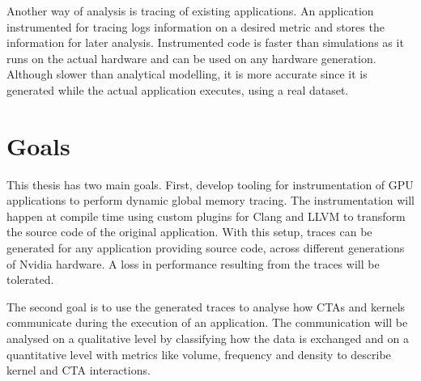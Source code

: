 Another way of analysis is tracing of existing applications. An application instrumented for tracing logs information on a desired metric and stores the information for later analysis. Instrumented code is faster than simulations as it runs on the actual hardware and can be used on any hardware generation. Although slower than analytical modelling, it is  more accurate since it is generated while the actual application executes, using a real dataset.


%	
\section{Goals}
This thesis has two main goals. First, develop tooling for instrumentation of GPU applications to perform dynamic global memory tracing. The instrumentation will happen at compile time using custom plugins for Clang and LLVM to transform the source code of the
original application. With this setup, traces can be generated for any application providing source code,
across different generations of Nvidia hardware. A loss in performance resulting from the traces will be tolerated.

The second goal is to use the generated traces to analyse how CTAs and kernels communicate during the execution of an application. The communication will be analysed on a qualitative level by classifying how the data is exchanged and on a quantitative level with metrics like volume, frequency and density to describe kernel and CTA interactions.


